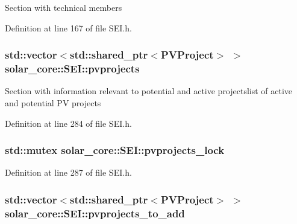 Section with technical members 

Definition at line 167 of file S\+E\+I.\+h.

\hypertarget{classsolar__core_1_1_s_e_i_a76d9d151e51465d534ff0fd3d64f98bc}{}
\subsubsection[{pvprojects}]{\setlength{\rightskip}{0pt plus 5cm}std\+::vector$<$std\+::shared\+\_\+ptr$<${\bf P\+V\+Project}$>$ $>$ solar\+\_\+core\+::\+S\+E\+I\+::pvprojects\hspace{0.3cm}{\ttfamily [protected]}}\label{classsolar__core_1_1_s_e_i_a76d9d151e51465d534ff0fd3d64f98bc}
Section with information relevant to potential and active projectslist of active and potential P\+V projects 

Definition at line 284 of file S\+E\+I.\+h.

\hypertarget{classsolar__core_1_1_s_e_i_adc031a01a6acf03d68b6d0037a2c8a30}{}
\subsubsection[{pvprojects\+\_\+lock}]{\setlength{\rightskip}{0pt plus 5cm}std\+::mutex solar\+\_\+core\+::\+S\+E\+I\+::pvprojects\+\_\+lock\hspace{0.3cm}{\ttfamily [protected]}}\label{classsolar__core_1_1_s_e_i_adc031a01a6acf03d68b6d0037a2c8a30}


Definition at line 287 of file S\+E\+I.\+h.

\hypertarget{classsolar__core_1_1_s_e_i_a99fe003b8fd35b6ef44dec39ed374ffe}{}
\subsubsection[{pvprojects\+\_\+to\+\_\+add}]{\setlength{\rightskip}{0pt plus 5cm}std\+::vector$<$std\+::shared\+\_\+ptr$<${\bf P\+V\+Project}$>$ $>$ solar\+\_\+core\+::\+S\+E\+I\+::pvprojects\+\_\+to\+\_\+add\hspace{0.3cm}{\ttfamily [protected]}}\label{classsolar__core_1_1_s_e_i_a99fe003b8fd35b6ef44dec39ed374ffe}


